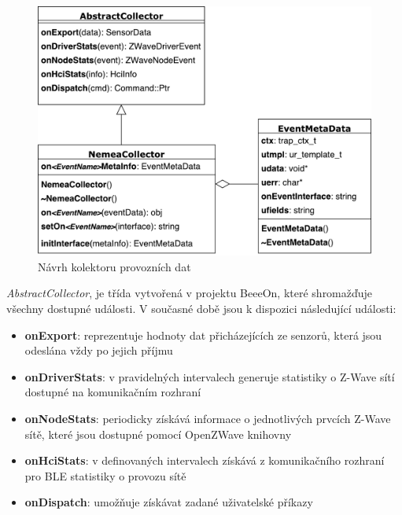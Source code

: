  \begin{figure}[ht]
   \begin{center}
   \includegraphics[scale=0.5]{pictures/modelTrid}
   \caption{Návrh kolektoru provozních dat}
   \label{obr.modelTrid}
   \end{center}
   \end{figure}
 
 \textit{AbstractCollector}, je třída vytvořená v projektu BeeeOn, které shromažďuje všechny dostupné události.
 V současné době jsou k dispozici následující události:
 \begin{itemize}
  \item \textbf{onExport}:
   reprezentuje hodnoty dat přicházejících ze senzorů, která jsou odeslána vždy po jejich příjmu
   
  \item \textbf{onDriverStats}:
   v pravidelných intervalech generuje statistiky o Z-Wave sítí dostupné na komunikačním 
   rozhraní
   
  \item \textbf{onNodeStats}:
   periodicky získává informace o jednotlivých prvcích Z-Wave sítě, které jsou dostupné pomocí
   OpenZWave knihovny
   
  \item \textbf{onHciStats}:
   v definovaných intervalech získává z komunikačního rozhraní pro BLE statistiky o provozu
   sítě
  
  \item \textbf{onDispatch}:
  umožňuje získávat zadané uživatelské příkazy
 \end{itemize}

